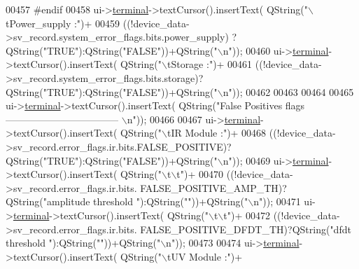 \begin{DoxyCode}
00457 \textcolor{preprocessor}{#endif}
00458        ui->\hyperlink{a00027_aae71c46ea4546df5994735dee573b2dd}{terminal}->textCursor().insertText( QString(\textcolor{stringliteral}{"\(\backslash\)tPower\_supply :"})+
00459                                             ((!device\_data->sv\_record.system\_error\_flags.bits.power\_supply)
      ?QString(\textcolor{stringliteral}{"TRUE"}):QString(\textcolor{stringliteral}{"FALSE"}))+QString(\textcolor{stringliteral}{"\(\backslash\)n"}));
00460        ui->\hyperlink{a00027_aae71c46ea4546df5994735dee573b2dd}{terminal}->textCursor().insertText( QString(\textcolor{stringliteral}{"\(\backslash\)tStorage :"})+
00461                                             ((!device\_data->sv\_record.system\_error\_flags.bits.storage)?
      QString(\textcolor{stringliteral}{"TRUE"}):QString(\textcolor{stringliteral}{"FALSE"}))+QString(\textcolor{stringliteral}{"\(\backslash\)n"}));
00462 
00463 
00464 
00465        ui->\hyperlink{a00027_aae71c46ea4546df5994735dee573b2dd}{terminal}->textCursor().insertText( QString(\textcolor{stringliteral}{"False Positives flags 
       ----------------------------------- \(\backslash\)n"}));
00466 
00467        ui->\hyperlink{a00027_aae71c46ea4546df5994735dee573b2dd}{terminal}->textCursor().insertText( QString(\textcolor{stringliteral}{"\(\backslash\)tIR Module :"})+
00468                                             ((!device\_data->sv\_record.error\_flags.ir.bits.FALSE\_POSITIVE)?
      QString(\textcolor{stringliteral}{"TRUE"}):QString(\textcolor{stringliteral}{"FALSE"}))+QString(\textcolor{stringliteral}{"\(\backslash\)n"}));
00469        ui->\hyperlink{a00027_aae71c46ea4546df5994735dee573b2dd}{terminal}->textCursor().insertText( QString(\textcolor{stringliteral}{"\(\backslash\)t\(\backslash\)t"})+
00470                                             ((!device\_data->sv\_record.error\_flags.ir.bits.
      FALSE\_POSITIVE\_AMP\_TH)?QString(\textcolor{stringliteral}{"amplitude threshold "}):QString(\textcolor{stringliteral}{""}))+QString(\textcolor{stringliteral}{"\(\backslash\)n"}));
00471        ui->\hyperlink{a00027_aae71c46ea4546df5994735dee573b2dd}{terminal}->textCursor().insertText( QString(\textcolor{stringliteral}{"\(\backslash\)t\(\backslash\)t"})+
00472                                             ((!device\_data->sv\_record.error\_flags.ir.bits.
      FALSE\_POSITIVE\_DFDT\_TH)?QString(\textcolor{stringliteral}{"dfdt threshold "}):QString(\textcolor{stringliteral}{""}))+QString(\textcolor{stringliteral}{"\(\backslash\)n"}));
00473 
00474        ui->\hyperlink{a00027_aae71c46ea4546df5994735dee573b2dd}{terminal}->textCursor().insertText( QString(\textcolor{stringliteral}{"\(\backslash\)tUV Module :"})+

\end{DoxyCode}
